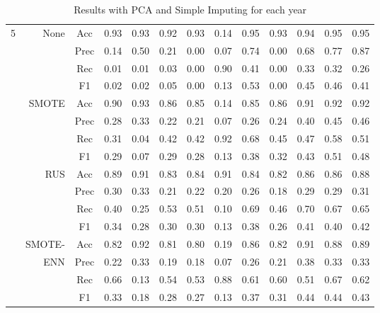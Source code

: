 \begin{table*}
\begin{narrow}{-1cm}{-1cm}
\begin{tabular}{r|r|c|cccccccccc}
        5 & None & Acc & 0.93 & 0.93 & 0.92 & 0.93 & 0.14 & 0.95 & 0.93 & 0.94 & 0.95 & 0.95 \\
        ~ & ~ & Prec & 0.14 & 0.50 & 0.21 & 0.00 & 0.07 & 0.74 & 0.00 & 0.68 & 0.77 & 0.87 \\
        ~ & ~ & Rec & 0.01 & 0.01 & 0.03 & 0.00 & 0.90 & 0.41 & 0.00 & 0.33 & 0.32 & 0.26 \\
        ~ & ~ & F1 & 0.02 & 0.02 & 0.05 & 0.00 & 0.13 & 0.53 & 0.00 & 0.45 & 0.46 & 0.41 \\
        \cline{2-13}
        ~ & SMOTE & Acc & 0.90 & 0.93 & 0.86 & 0.85 & 0.14 & 0.85 & 0.86 & 0.91 & 0.92 & 0.92 \\
        ~ & ~ & Prec & 0.28 & 0.33 & 0.22 & 0.21 & 0.07 & 0.26 & 0.24 & 0.40 & 0.45 & 0.46 \\
        ~ & ~ & Rec & 0.31 & 0.04 & 0.42 & 0.42 & 0.92 & 0.68 & 0.45 & 0.47 & 0.58 & 0.51 \\
        ~ & ~ & F1 & 0.29 & 0.07 & 0.29 & 0.28 & 0.13 & 0.38 & 0.32 & 0.43 & 0.51 & 0.48 \\
        \cline{2-13}
        ~ & RUS & Acc & 0.89 & 0.91 & 0.83 & 0.84 & 0.91 & 0.84 & 0.82 & 0.86 & 0.86 & 0.88 \\
        ~ & ~ & Prec & 0.30 & 0.33 & 0.21 & 0.22 & 0.20 & 0.26 & 0.18 & 0.29 & 0.29 & 0.31 \\
        ~ & ~ & Rec & 0.40 & 0.25 & 0.53 & 0.51 & 0.10 & 0.69 & 0.46 & 0.70 & 0.67 & 0.65 \\
        ~ & ~ & F1 & 0.34 & 0.28 & 0.30 & 0.30 & 0.13 & 0.38 & 0.26 & 0.41 & 0.40 & 0.42 \\
        \cline{2-13}
        ~ & SMOTE- & Acc & 0.82 & 0.92 & 0.81 & 0.80 & 0.19 & 0.86 & 0.82 & 0.91 & 0.88 & 0.89 \\
        ~ & ENN & Prec & 0.22 & 0.33 & 0.19 & 0.18 & 0.07 & 0.26 & 0.21 & 0.38 & 0.33 & 0.33 \\
        ~ & ~ & Rec & 0.66 & 0.13 & 0.54 & 0.53 & 0.88 & 0.61 & 0.60 & 0.51 & 0.67 & 0.62 \\
        ~ & ~ & F1 & 0.33 & 0.18 & 0.28 & 0.27 & 0.13 & 0.37 & 0.31 & 0.44 & 0.44 & 0.43 \\

       \hline \hline
   \end{tabular}


 \caption{\label{tab::pca_results} Results with PCA and Simple Imputing for each year}
\end{narrow}
\end{table*} 